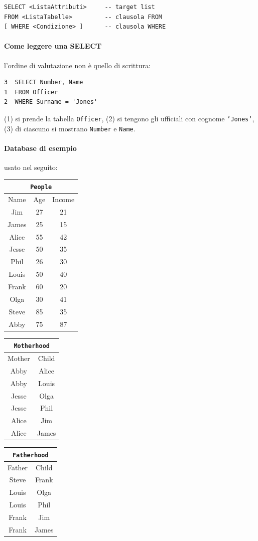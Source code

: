 \documentclass[a4paper,12pt]{article}
\begin{document}
\begin{verbatim}
SELECT <ListaAttributi>     -- target list
FROM <ListaTabelle>         -- clausola FROM
[ WHERE <Condizione> ]      -- clausola WHERE
\end{verbatim}

\paragraph{Come leggere una SELECT} l'ordine di valutazione non è quello di
scrittura:
\begin{verbatim}
3  SELECT Number, Name
1  FROM Officer
2  WHERE Surname = 'Jones'
\end{verbatim}
(1) si prende la tabella \texttt{Officer}, (2) si tengono gli ufficiali con
cognome \texttt{'Jones'}, (3) di ciascuno si mostrano \texttt{Number} e
\texttt{Name}.

\paragraph{Database di esempio} usato nel seguito:

\begin{center}
\begin{tabular}{ccc}
\multicolumn{3}{c}{\texttt{People}}\\ \hline
Name & Age & Income\\ \hline
Jim & 27 & 21\\ James & 25 & 15\\ Alice & 55 & 42\\ Jesse & 50 & 35\\
Phil & 26 & 30\\ Louis & 50 & 40\\ Frank & 60 & 20\\ Olga & 30 & 41\\
Steve & 85 & 35\\ Abby & 75 & 87\\ \hline
\end{tabular}
\qquad
\begin{tabular}{cc}
\multicolumn{2}{c}{\texttt{Motherhood}}\\ \hline
Mother & Child\\ \hline
Abby & Alice\\ Abby & Louis\\ Jesse & Olga\\ Jesse & Phil\\ Alice & Jim\\
Alice & James\\ \hline
\end{tabular}
\qquad
\begin{tabular}{cc}
\multicolumn{2}{c}{\texttt{Fatherhood}}\\ \hline
Father & Child\\ \hline
Steve & Frank\\ Louis & Olga\\ Louis & Phil\\ Frank & Jim\\ Frank & James\\
\hline
\end{tabular}
\end{center}
\end{document}

